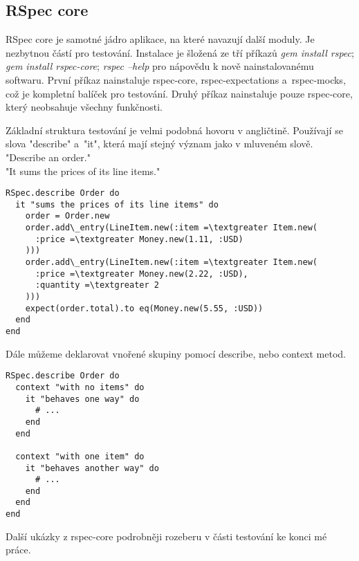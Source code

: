 \subsection{RSpec core}
\par RSpec core je samotné jádro aplikace, na které navazují další moduly. Je nezbytnou částí pro testování. Instalace je šložená ze tří příkazů \textit{gem install rspec}; \textit{gem install rspec-core}; \textit{rspec --help} pro nápovědu k nově nainstalovanému softwaru. První příkaz nainstaluje rspec-core, rspec-expectations a~rspec-mocks, což je kompletní balíček pro testování. Druhý příkaz nainstaluje pouze rspec-core, který neobsahuje všechny funkčnosti.
\par Základní struktura testování je velmi podobná hovoru v angličtině. Používají se slova "describe" a~"it", která mají stejný význam jako v mluveném slově.\\
"Describe an order."\\
"It sums the prices of its line items."\\
\begin{verbatim}
RSpec.describe Order do
  it "sums the prices of its line items" do
    order = Order.new
    order.add\_entry(LineItem.new(:item =\textgreater Item.new(
      :price =\textgreater Money.new(1.11, :USD)
    )))
    order.add\_entry(LineItem.new(:item =\textgreater Item.new(
      :price =\textgreater Money.new(2.22, :USD),
      :quantity =\textgreater 2
    )))
    expect(order.total).to eq(Money.new(5.55, :USD))
  end
end
\end{verbatim}
Dále můžeme deklarovat vnořené skupiny pomocí describe, nebo context metod.
\begin{verbatim}
RSpec.describe Order do
  context "with no items" do
    it "behaves one way" do
      # ...
    end
  end

  context "with one item" do
    it "behaves another way" do
      # ...
    end
  end
end
\end{verbatim}
Další ukázky z rspec-core podrobněji rozeberu v části testování ke konci mé práce.

